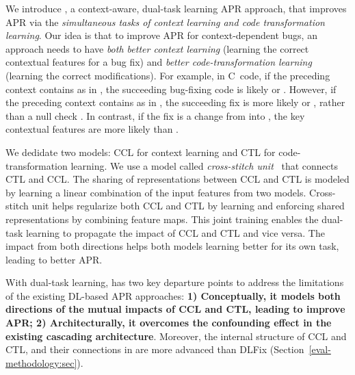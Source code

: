 We introduce {\tool}, a context-aware, dual-task learning APR
approach, that improves APR via the {\em simultaneous tasks of context
  learning and code transformation learning}. Our idea is that to
improve APR for context-dependent bugs, an approach needs to have {\em
  both better context learning} (learning the correct contextual
features for a bug fix) and {\em better code-transformation learning}
(learning the correct modifications). For example, in C~code, if the
preceding context contains  as in , the succeeding bug-fixing code is likely 
 \code{!=}  or  \code{==}
. However, if the preceding context contains 
as in  \code{=} , the
succeeding fix is more likely  \code{!=}
 or  \code{==} , rather than a
null check  \code{!=} . In contrast, if the
fix is a change from  \code{==}  into
 \code{!=} , the key contextual features are
more likely  than .

We dedidate two models: CCL for context learning and CTL for
code-transformation learning. We use a model called {\em cross-stitch
  unit}~\cite{misra2016cross} that connects CTL and CCL. The sharing
of representations between CCL and CTL is modeled by learning a linear
combination of the input features from two models. Cross-stitch unit
helps regularize both CCL and CTL by learning and enforcing shared
representations by combining feature maps. This joint training enables
the dual-task learning to propagate the impact of CCL and CTL and vice
versa. The impact from both directions helps both models learning
better for its own task, leading to better APR.

%
With dual-task learning, {\tool} has two key departure points to
address the limitations of the existing DL-based APR approaches:
{\bf 1) Conceptually, it models both directions of the mutual impacts
  of CCL and CTL, leading to improve APR; 2) Architecturally, it
  overcomes the confounding effect in the existing cascading
  architecture}. Moreover, the internal structure of CCL and CTL, and
their connections in {\tool} are more advanced than DLFix
(Section~\ref{eval-methodology:sec}).

